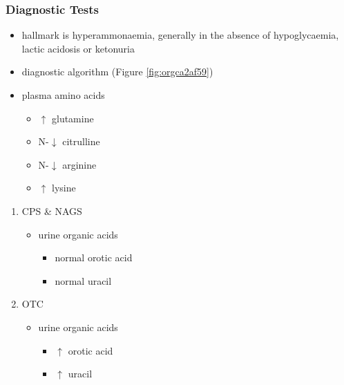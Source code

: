 \documentclass{scrartcl}
\begin{document}
\subsubsection{Diagnostic Tests}
\label{sec:org1f1a93c}
\begin{itemize}
\item hallmark is hyperammonaemia, generally in the absence of
hypoglycaemia, lactic acidosis or ketonuria
\item diagnostic algorithm (Figure \ref{fig:orgca2af59})
\item plasma amino acids
\begin{itemize}
\item \(\uparrow\) glutamine
\item N-\(\downarrow\) citrulline
\item N-\(\downarrow\) arginine
\item \(\uparrow\) lysine
\end{itemize}
\end{itemize}
\begin{enumerate}
\item CPS \& NAGS
\label{sec:orgfcc9088}
\begin{itemize}
\item urine organic acids
\begin{itemize}
\item normal orotic acid
\item normal uracil
\end{itemize}
\end{itemize}
\item OTC
\label{sec:org3cffaea}
\begin{itemize}
\item urine organic acids
\begin{itemize}
\item \(\uparrow\) orotic acid
\item \(\uparrow\) uracil
\end{itemize}
\end{itemize}
\end{enumerate}
\end{document}
